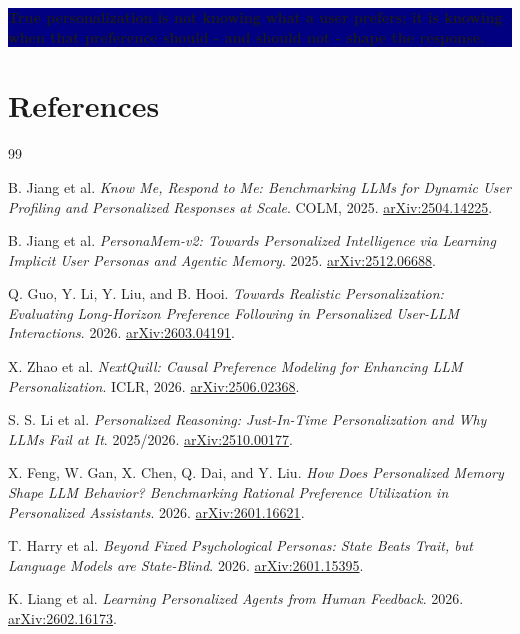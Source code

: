 \documentclass[10.5pt,a4paper]{article}
\begin{document}
\begin{center}
\vspace{1mm}
\colorbox{navy}{\parbox{0.94\textwidth}{\centering\color{white}\large\bfseries
True personalization is not knowing what a user prefers; it is knowing when that preference should - and should not - shape the response.}}
\end{center}

\section*{References}
\small
\begin{thebibliography}{99}

B. Jiang et al. \emph{Know Me, Respond to Me: Benchmarking LLMs for Dynamic User Profiling and Personalized Responses at Scale}. COLM, 2025. \href{https://arxiv.org/abs/2504.14225}{arXiv:2504.14225}.

B. Jiang et al. \emph{PersonaMem-v2: Towards Personalized Intelligence via Learning Implicit User Personas and Agentic Memory}. 2025. \href{https://arxiv.org/abs/2512.06688}{arXiv:2512.06688}.

Q. Guo, Y. Li, Y. Liu, and B. Hooi. \emph{Towards Realistic Personalization: Evaluating Long-Horizon Preference Following in Personalized User-LLM Interactions}. 2026. \href{https://arxiv.org/abs/2603.04191}{arXiv:2603.04191}.

X. Zhao et al. \emph{NextQuill: Causal Preference Modeling for Enhancing LLM Personalization}. ICLR, 2026. \href{https://arxiv.org/abs/2506.02368}{arXiv:2506.02368}.

S. S. Li et al. \emph{Personalized Reasoning: Just-In-Time Personalization and Why LLMs Fail at It}. 2025/2026. \href{https://arxiv.org/abs/2510.00177}{arXiv:2510.00177}.

X. Feng, W. Gan, X. Chen, Q. Dai, and Y. Liu. \emph{How Does Personalized Memory Shape LLM Behavior? Benchmarking Rational Preference Utilization in Personalized Assistants}. 2026. \href{https://arxiv.org/abs/2601.16621}{arXiv:2601.16621}.

T. Harry et al. \emph{Beyond Fixed Psychological Personas: State Beats Trait, but Language Models are State-Blind}. 2026. \href{https://arxiv.org/abs/2601.15395}{arXiv:2601.15395}.

K. Liang et al. \emph{Learning Personalized Agents from Human Feedback}. 2026. \href{https://arxiv.org/abs/2602.16173}{arXiv:2602.16173}.


\end{thebibliography}
\end{document}

